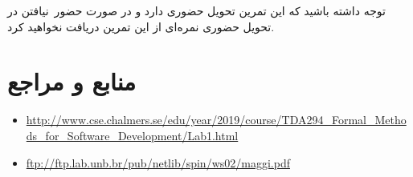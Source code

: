 \documentclass[a4paper]{article}
\begin{document}
توجه داشته باشید که این تمرین تحویل حضوری دارد و در صورت حضور~نیافتن در تحویل حضوری نمره‌ای از این تمرین دریافت نخواهید کرد.

\section*{منابع و مراجع}

\begin{latin}
\scriptsize
\begin{itemize}
    \item \url{http://www.cse.chalmers.se/edu/year/2019/course/TDA294_Formal_Methods_for_Software_Development/Lab1.html}
    \item \url{ftp://ftp.lab.unb.br/pub/netlib/spin/ws02/maggi.pdf}
\end{itemize}
\end{latin}
 
\end{document}

